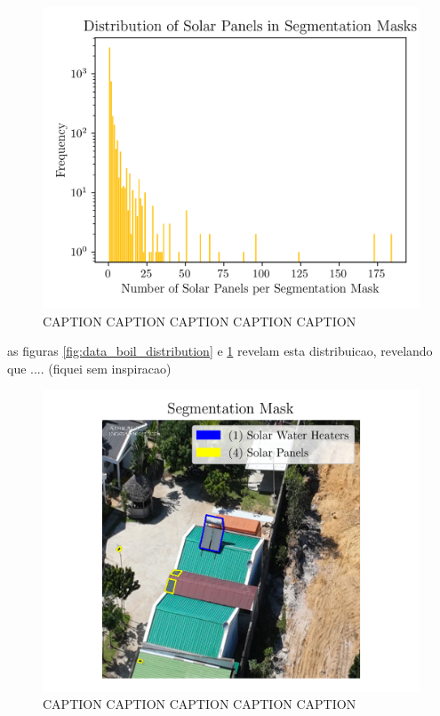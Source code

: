 \documentclass[conference]{IEEEtran}
\begin{document}
\begin{figure}[H]
    \centering
    \includegraphics[width=1\linewidth]{assets/data_panel_distribution.png}
    \caption{CAPTION CAPTION CAPTION CAPTION CAPTION}
    \label{fig:data_panel_distribution}
\end{figure}

as figuras \ref{fig:data_boil_distribution} e \ref{fig:data_panel_distribution} revelam esta distribuicao, revelando que .... (fiquei sem inspiracao)


\begin{figure}[H]
    \centering
    \includegraphics[width=1\linewidth]{assets/data_segmentation_mask.png}
    \caption{CAPTION CAPTION CAPTION CAPTION CAPTION}
    \label{fig:data_segmentation_mask}
\end{figure}
\end{document}
